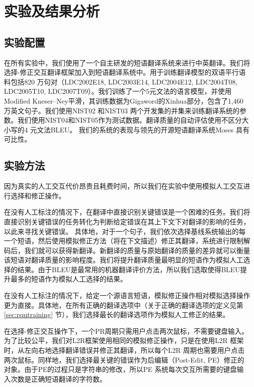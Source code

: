 \documentclass[master, winfont]{njuthesis}
\begin{document}
\section{实验及结果分析}
\label{experiment:primt}
\subsection{实验配置}
在所有实验中，我们使用了一个自主研发的短语翻译系统来进行中英翻译。我们将选择-修正交互翻译框架加入到短语翻译系统中。用于训练翻译模型的双语平行语料包括820 万句对（LDC2002E18, LDC2003E14, LDC2004E12, LDC2004T08, LDC2005T10, LDC2007T09）。我们训练了一个$5$元文法的语言模型，并使用Modified Kneser–Ney平滑\cite{chen1999empirical}，其训练数据为Gigaword的Xinhua部分，包含了1,460万英文句子。我们使用NIST02 和NIST03 两个开发集的并集来训练翻译系统的参数。我们使用NIST04和NIST05作为测试数据。翻译质量的自动评估使用不区分大小写的$4$ 元文法BLEU。 我们的系统的表现与领先的开源短语翻译系统Moses\cite{koehn2003statistical} 具有可比性。

\subsection{实验方法}
\label{sec:simulate}
因为真实的人工交互代价昂贵且耗费时间，所以我们在实验中使用模拟人工交互进行选择和修正操作。

在没有人工标注的情况下，在翻译中直接识别关键错误是一个困难的任务。我们将直接识别关键错误的任务转化为判断给定错误在其上下文下对翻译的影响的任务，以此来寻找关键错误。
具体地，对于一个句子，我们依次选择基线系统输出的每一个短语，然后使用模拟修正方法（将在下文描述）修正其翻译，系统进行限制解码后，我们就可以获得新翻译。新翻译的质量与原始翻译的质量的差异就可以衡量该短语对翻译质量的影响程度。我们将提升翻译质量最明显的短语作为模拟人工选择的结果。由于BLEU是最常用的机器翻译评价方法，所以我们选取使得BLEU提升最多的短语作为模拟人工选择的结果。

在没有人工标注的情况下，给定一个源语言短语，模拟修正操作相对模拟选择操作更为直接。具体地，在所有正确的翻译选项中（关于正确的翻译选项的定义见第\ref{sec:rsmtraining} 节），我们选择最长的翻译选项作为模拟人工修正的结果。

在选择-修正交互操作下，一个PR周期只需用户点击两次鼠标，不需要键盘输入。为了比较公平，我们对L2R框架使用相同的模拟修正操作，只是在使用L2R 框架时，从左向右地选择翻译错误并修正其翻译，所以每个L2R 周期也需要用户点击两次鼠标。同样地，我们选择最关键的错误作为后编辑（Post-Edit, PE）修正的对象。由于PE的过程只是字符串的修改，所以PE 系统每次交互所需要的键盘输入次数是正确短语翻译的字符数。
\end{document}
